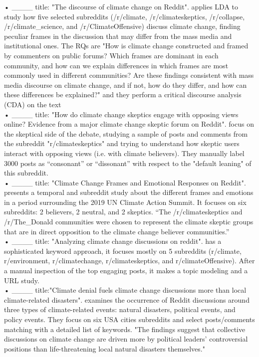 \begin{itemize}
• ____ title: "The discourse of climate change on Reddit". applies LDA to study how five selected subreddits (/r/climate, /r/climateskeptics, /r/collapse, /r/climate\_science, and /r/ClimateOffensive) discuss climate change, finding peculiar frames in the discussion that may differ from the mass media and institutional ones. The RQs are "How is climate change constructed and framed by commenters on public forums? Which frames are dominant in each community, and how can we explain differences in which frames are most commonly used in different communities? Are these findings consistent with mass media discourse on climate change, and if not, how do they differ, and how can these differences be explained?" and they perform a critical discourse analysis (CDA) on the text\\

• ____ title: "How do climate change skeptics engage with opposing views online? Evidence from a major climate change skeptic forum on Reddit".  focus on the skeptical side of the debate, studying a sample of posts and comments from the subreddit "r/climateskeptics" and trying to understand how skeptic users interact with opposing views (i.e. with climate believers). They manually label 3000 posts as “consonant” or “dissonant” with respect to the "default leaning" of this subreddit.  \\

• ____ title: "Climate Change Frames and Emotional Responses on Reddit". presents a temporal and subreddit study about the different frames and emotions in a period surrounding the 2019 UN Climate Action Summit. It focuses on six subreddits:  2 believers, 2 neutral, and 2 skeptics. “The /r/climateskeptics and /r/The\_Donald communities were chosen to represent the climate skeptic groups that are in direct opposition to the climate change believer communities.”\\

• ____  title: "Analyzing climate change discussions on reddit". has a sophisticated keyword approach, it focuses mostly on 5 subreddits (r/climate, r/environment, r/climatechange, r/climateskeptics, and r/climateOffensive). After a manual inspection of the top engaging posts, it makes a topic modeling and a URL study.\\

• ____ title:"Climate denial fuels climate change discussions more than local climate-related disasters". examines the occurrence of Reddit discussions around three types of climate-related events: natural disasters, political events, and policy events. They focus on six USA cities subreddits and select posts/comments matching with a detailed list of keywords. "The findings suggest that collective discussions on climate change are driven more by political leaders’ controversial positions than life-threatening local natural disasters themselves."\\


\end{itemize}
